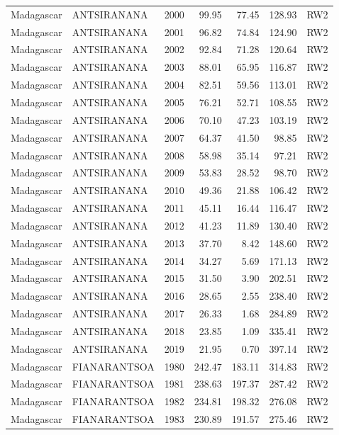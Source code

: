 \begin{longtable}{lllrrrl}
  Madagascar & ANTSIRANANA & 2000 & 99.95 & 77.45 & 128.93 & RW2 \\ 
  Madagascar & ANTSIRANANA & 2001 & 96.82 & 74.84 & 124.90 & RW2 \\ 
  Madagascar & ANTSIRANANA & 2002 & 92.84 & 71.28 & 120.64 & RW2 \\ 
  Madagascar & ANTSIRANANA & 2003 & 88.01 & 65.95 & 116.87 & RW2 \\ 
  Madagascar & ANTSIRANANA & 2004 & 82.51 & 59.56 & 113.01 & RW2 \\ 
  Madagascar & ANTSIRANANA & 2005 & 76.21 & 52.71 & 108.55 & RW2 \\ 
  Madagascar & ANTSIRANANA & 2006 & 70.10 & 47.23 & 103.19 & RW2 \\ 
  Madagascar & ANTSIRANANA & 2007 & 64.37 & 41.50 & 98.85 & RW2 \\ 
  Madagascar & ANTSIRANANA & 2008 & 58.98 & 35.14 & 97.21 & RW2 \\ 
  Madagascar & ANTSIRANANA & 2009 & 53.83 & 28.52 & 98.70 & RW2 \\ 
  Madagascar & ANTSIRANANA & 2010 & 49.36 & 21.88 & 106.42 & RW2 \\ 
  Madagascar & ANTSIRANANA & 2011 & 45.11 & 16.44 & 116.47 & RW2 \\ 
  Madagascar & ANTSIRANANA & 2012 & 41.23 & 11.89 & 130.40 & RW2 \\ 
  Madagascar & ANTSIRANANA & 2013 & 37.70 & 8.42 & 148.60 & RW2 \\ 
  Madagascar & ANTSIRANANA & 2014 & 34.27 & 5.69 & 171.13 & RW2 \\ 
  Madagascar & ANTSIRANANA & 2015 & 31.50 & 3.90 & 202.51 & RW2 \\ 
  Madagascar & ANTSIRANANA & 2016 & 28.65 & 2.55 & 238.40 & RW2 \\ 
  Madagascar & ANTSIRANANA & 2017 & 26.33 & 1.68 & 284.89 & RW2 \\ 
  Madagascar & ANTSIRANANA & 2018 & 23.85 & 1.09 & 335.41 & RW2 \\ 
  Madagascar & ANTSIRANANA & 2019 & 21.95 & 0.70 & 397.14 & RW2 \\ 
  Madagascar & FIANARANTSOA & 1980 & 242.47 & 183.11 & 314.83 & RW2 \\ 
  Madagascar & FIANARANTSOA & 1981 & 238.63 & 197.37 & 287.42 & RW2 \\ 
  Madagascar & FIANARANTSOA & 1982 & 234.81 & 198.32 & 276.08 & RW2 \\ 
  Madagascar & FIANARANTSOA & 1983 & 230.89 & 191.57 & 275.46 & RW2 \\ 

\end{longtable}

